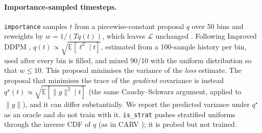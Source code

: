 \paragraph{Importance-sampled timesteps.}
\texttt{importance} samples $t$ from a piecewise-constant proposal $q$ over 50 bins and reweights by
$w=1/(Tq(t))$, which leaves $\mathcal L$ unchanged \citep{kingma2023understanding}. Following Improved DDPM
\citep{nichol2021improved}, $q(t)\propto\sqrt{\mathbb E[\ell^2\mid t]}$, estimated from a 100-sample history per
bin, used after every bin is filled, and mixed 90/10 with the uniform distribution so that $w\le 10$.
This proposal minimises the variance of the \emph{loss} estimate. The proposal that minimises the
trace of the \emph{gradient} covariance is instead $q^\star(t)\propto\sqrt{\mathbb E[\|g\|^2\mid t]}$
(the same Cauchy--Schwarz argument, applied to $\|g\|$), and it can differ substantially. We report the
predicted variance under $q^\star$ as an oracle and do not train with it. \texttt{is\_strat}
pushes stratified uniforms through the inverse CDF of $q$ (as in CARV \citep{carv2026}); it is probed but
not trained.
